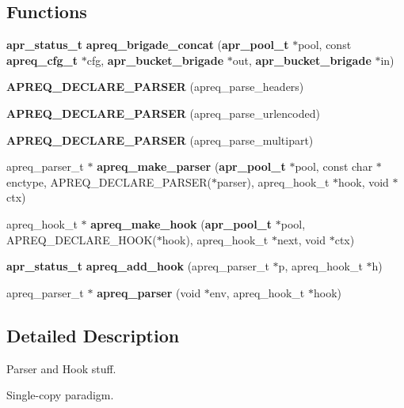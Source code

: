 \subsection*{Functions}
\begin{CompactItemize}
\item 
{\bf apr\_\-status\_\-t} {\bf apreq\_\-brigade\_\-concat} ({\bf apr\_\-pool\_\-t} $\ast$pool, const {\bf apreq\_\-cfg\_\-t} $\ast$cfg, {\bf apr\_\-bucket\_\-brigade} $\ast$out, {\bf apr\_\-bucket\_\-brigade} $\ast$in)\label{apreq__parsers_8h_a7}

\item 
{\bf APREQ\_\-DECLARE\_\-PARSER} (apreq\_\-parse\_\-headers)\label{apreq__parsers_8h_a8}

\item 
{\bf APREQ\_\-DECLARE\_\-PARSER} (apreq\_\-parse\_\-urlencoded)\label{apreq__parsers_8h_a9}

\item 
{\bf APREQ\_\-DECLARE\_\-PARSER} (apreq\_\-parse\_\-multipart)\label{apreq__parsers_8h_a10}

\item 
apreq\_\-parser\_\-t $\ast$ {\bf apreq\_\-make\_\-parser} ({\bf apr\_\-pool\_\-t} $\ast$pool, const char $\ast$enctype, APREQ\_\-DECLARE\_\-PARSER($\ast$parser), apreq\_\-hook\_\-t $\ast$hook, void $\ast$ctx)\label{apreq__parsers_8h_a11}

\item 
apreq\_\-hook\_\-t $\ast$ {\bf apreq\_\-make\_\-hook} ({\bf apr\_\-pool\_\-t} $\ast$pool, APREQ\_\-DECLARE\_\-HOOK($\ast$hook), apreq\_\-hook\_\-t $\ast$next, void $\ast$ctx)\label{apreq__parsers_8h_a12}

\item 
{\bf apr\_\-status\_\-t} {\bf apreq\_\-add\_\-hook} (apreq\_\-parser\_\-t $\ast$p, apreq\_\-hook\_\-t $\ast$h)\label{apreq__parsers_8h_a13}

\item 
apreq\_\-parser\_\-t $\ast$ {\bf apreq\_\-parser} (void $\ast$env, apreq\_\-hook\_\-t $\ast$hook)\label{apreq__parsers_8h_a14}

\end{CompactItemize}


\subsection{Detailed Description}
Parser and Hook stuff.

Single-copy paradigm.